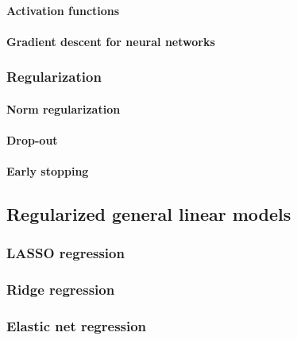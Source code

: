 \documentclass[]{article}
\let\oldparagraph\paragraph
\renewcommand{\paragraph}[1]{\oldparagraph{#1}\mbox{}}
\begin{document}
\paragraph{Activation functions}\label{activation-functions}

\paragraph{Gradient descent for neural
networks}\label{gradient-descent-for-neural-networks}

\subsubsection{Regularization}\label{regularization}

\paragraph{Norm regularization}\label{norm-regularization}

\paragraph{Drop-out}\label{drop-out}

\paragraph{Early stopping}\label{early-stopping}

\subsection{Regularized general linear
models}\label{regularized-general-linear-models}

\subsubsection{LASSO regression}\label{lasso-regression}

\subsubsection{Ridge regression}\label{ridge-regression}

\subsubsection{Elastic net regression}\label{elastic-net-regression}
\end{document}
